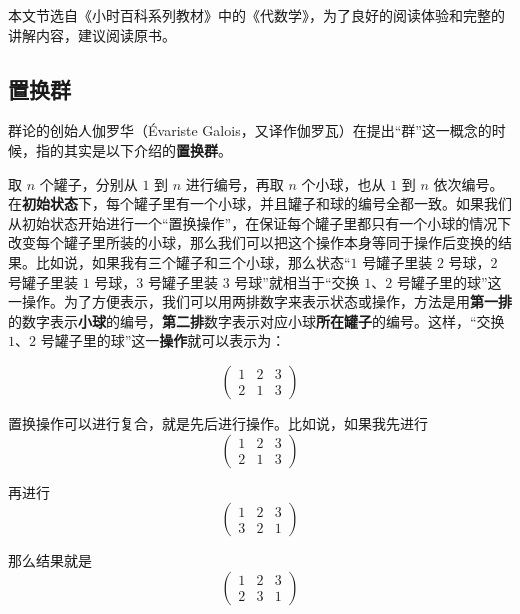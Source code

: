 

本文节选自《小时百科系列教材》中的《代数学》，为了良好的阅读体验和完整的讲解内容，建议阅读原书。


\subsection{置换群}

群论的创始人伽罗华（Évariste Galois，又译作伽罗瓦）在提出“群”这一概念的时候，指的其实是以下介绍的\textbf{置换群}。

取 $n$ 个罐子，分别从 $1$ 到 $n$ 进行编号，再取 $n$ 个小球，也从 $1$ 到 $n$ 依次编号。在\textbf{初始状态}下，每个罐子里有一个小球，并且罐子和球的编号全都一致。如果我们从初始状态开始进行一个“置换操作”，在保证每个罐子里都只有一个小球的情况下改变每个罐子里所装的小球，那么我们可以把这个操作本身等同于操作后变换的结果。比如说，如果我有三个罐子和三个小球，那么状态“$1$ 号罐子里装 $2$ 号球，$2$ 号罐子里装 $1$ 号球，$3$ 号罐子里装 $3$ 号球”就相当于“交换 $1$、$2$ 号罐子里的球”这一操作。为了方便表示，我们可以用两排数字来表示状态或操作，方法是用\textbf{第一排}的数字表示\textbf{小球}的编号，\textbf{第二排}数字表示对应小球\textbf{所在罐子}的编号。这样，“交换 $1$、$2$ 号罐子里的球”这一\textbf{操作}就可以表示为：

\begin{equation}\begin{pmatrix}
1&2&3\\2&1&3
\end{pmatrix}\end{equation}


置换操作可以进行复合，就是先后进行操作。比如说，如果我先进行\begin{equation}\begin{pmatrix}
1&2&3\\2&1&3
\end{pmatrix}\end{equation}

再进行\begin{equation}\begin{pmatrix}
1&2&3\\3&2&1
\end{pmatrix}\end{equation}

那么结果就是\begin{equation}\begin{pmatrix}
1&2&3\\2&3&1
\end{pmatrix}\end{equation}

